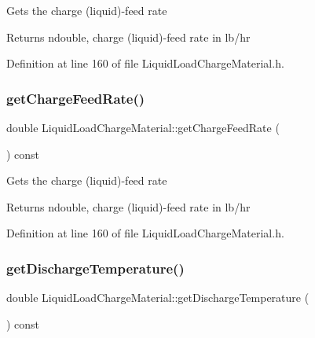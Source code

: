 Gets the charge (liquid)-\/feed rate \begin{DoxyReturn}{Returns}
ndouble, charge (liquid)-\/feed rate in lb/hr 
\end{DoxyReturn}


Definition at line 160 of file Liquid\+Load\+Charge\+Material.\+h.

\mbox{\label{class_liquid_load_charge_material_af818c541527b3b28a8f84a08dc0c884e}} 
\subsubsection{\texorpdfstring{get\+Charge\+Feed\+Rate()}{getChargeFeedRate()}\hspace{0.1cm}{\footnotesize\ttfamily [3/3]}}
{\footnotesize\ttfamily double Liquid\+Load\+Charge\+Material\+::get\+Charge\+Feed\+Rate (\begin{DoxyParamCaption}{ }\end{DoxyParamCaption}) const\hspace{0.3cm}{\ttfamily [inline]}}

Gets the charge (liquid)-\/feed rate \begin{DoxyReturn}{Returns}
ndouble, charge (liquid)-\/feed rate in lb/hr 
\end{DoxyReturn}


Definition at line 160 of file Liquid\+Load\+Charge\+Material.\+h.

\mbox{\label{class_liquid_load_charge_material_ad474f33059c99aa94e1d63738e11ff0e}} 
\subsubsection{\texorpdfstring{get\+Discharge\+Temperature()}{getDischargeTemperature()}\hspace{0.1cm}{\footnotesize\ttfamily [1/3]}}
{\footnotesize\ttfamily double Liquid\+Load\+Charge\+Material\+::get\+Discharge\+Temperature (\begin{DoxyParamCaption}{ }\end{DoxyParamCaption}) const\hspace{0.3cm}{\ttfamily [inline]}}

